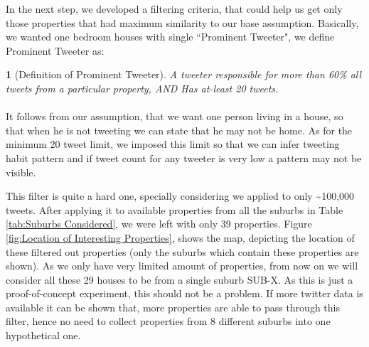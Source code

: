 \documentclass[12pt]{report}
\theoremstyle{named}
\newtheorem*{namedtheorem}{}
\begin{document}
In the next step, we developed a filtering criteria, that could help us get only those properties that had maximum similarity to our base assumption. Basically, we wanted  one bedroom houses with single ``Prominent Tweeter", we define Prominent Tweeter as:


\begin{namedtheorem}[Definition of Prominent Tweeter] A tweeter responsible for more than 60\% all tweets from a particular property, AND Has at-least 20 tweets.
\end{namedtheorem}
\paragraph{}
It follows from our assumption, that we want one person living in a house, so that when he is not tweeting we can state that he may not be home. As for the minimum 20 tweet limit, we imposed this limit so that we can infer tweeting habit pattern and if tweet count for any tweeter is very low a pattern may not be visible.

This filter is quite a hard one, specially considering we applied to only \textasciitilde100,000 tweets. After applying it to available properties from all the suburbs in Table \ref{tab:Suburbs Considered}, we were left with only 39 properties. Figure \ref{fig:Location of Interesting Properties}, shows the map, depicting the location of these filtered out properties (only the suburbs which contain these properties are shown). As we only have very limited amount of properties, from now on we will consider all these 29 houses to be from a single suburb SUB-X. As this is just a proof-of-concept experiment, this should not be a problem. If more twitter data is available it can be shown that, more properties are able to pass through this filter, hence no need to collect properties from 8 different suburbs into one hypothetical one.
\end{document}
